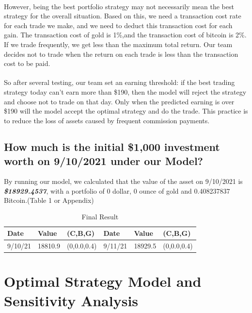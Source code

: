 \documentclass[12pt]{article}
\begin{document}
\paragraph{}
However, being the best portfolio strategy may not necessarily mean the best strategy for the overall situation.
Based on this, we need a transaction cost rate for each trade we make, and we need to deduct this transaction cost for each gain. The transaction cost of gold is 1\%,and the transaction cost of bitcoin is 2\%. If we trade frequently, we get less than the maximum total return. Our team decides not to trade when the return on each trade is less than the transaction cost to be paid.
\paragraph{}
So after several testing, our team set an earning threshold: if the best trading strategy today can't earn more than \$190, then the model will reject the strategy and choose not to trade on that day. Only when the predicted earning is over \$190 will the model accept the optimal strategy and do the trade. This practice is to reduce the loss of assets caused by frequent commission payments.

\subsection{How much is the initial \$1,000 investment worth on 9/10/2021 under our Model?}
By running our model, we calculated that the value of the asset on 9/10/2021 is \emph{\textbf{\$18929.4537}}, with a portfolio of 0 dollar, 0 ounce of gold and 0.408237837 Bitcoin.(Table 1 or Appendix)

\begin{table}
    \caption{Final Result}
    \begin{center}
    \begin{tabular}{p{40pt}p{40pt}p{40pt}p{40pt}p{40pt}p{40pt}}
    \toprule
    Date & Value&(C,B,G)&Date & Value&(C,B,G)\\
    \midrule
    9/10/21&18810.9&(0,0.0,0.4)&9/11/21&18929.5&(0,0.0,0.4)\\
    \bottomrule 
    \end{tabular}
    \end{center}
    \end{table}
\section{Optimal Strategy Model and Sensitivity Analysis}
\end{document}

